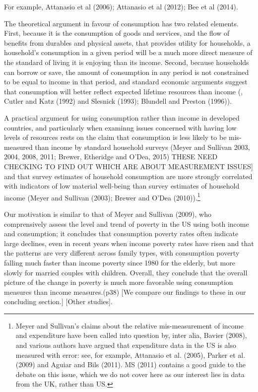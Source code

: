  For example, Attanasio et al (2006); Attanasio et al (2012); Bee et al (2014). 


The theoretical argument in favour of consumption has two related elements. First, because it is the consumption of goods and services, and the flow of benefits from durables and physical assets, that provides utility for households, a household's consumption in a given period will be a much more direct measure of the standard of living it is enjoying than its income. Second, because households can borrow or save, the amount of consumption in any period is not constrained to be equal to income in that period, and standard economic arguments suggest that consumption will better reflect expected lifetime resources than income (\cite{Poterba1989}, Cutler and Katz (1992) and Slesnick (1993); Blundell and Preston (1996)).

A practical argument for using consumption rather than income in developed countries, and particularly when examinng issues concerned with having low levels of resources rests on the claim that consumption is less likely to be mis-measured than income by standard household surveys  (Meyer and Sullivan 2003, 2004, 2008, 2011; Brewer, Etheridge and O'Dea, 2015) THESE NEED CHECKING TO FIND OUT WHICH ARE ABOUT MEASUREMENT ISSUES] and that survey estimates of household consumption are more strongly correlated with indicators of low material well-being than survey estimates of household income (Meyer and Sullivan (2003); Brewer and O'Dea (2010)).\footnote{Meyer and Sullivan's claims about the relative mis-measurement of income and expenditure have been called into question by, inter alia, Bavier (2008), and various authors have argued that expenditure data in the US is also measured with error: see, for example, Attanasio et al. (2005), Parker et al. (2009) and Aguiar and Bils (2011). MS (2011) contains a good guide to the debate on this issue, which we do not cover here as our interest lies in data from the UK, rather than US.}



Our motivation is similar to that of Meyer and Sullivan (2009), who comprensively assess the level and trend of poverty in the US using both income and consumption; it concludes that consumption poverty rates often indicate large declines, even in recent years when income poverty rates have risen and that the patterns are very different across family types, with consumption poverty falling much faster than income poverty since 1980 for the elderly, but more slowly for married couples with children. Overall, they conclude that the overall picture of the change in poverty is much more favorable using consumption measures than income measures.(p38) [We compare our findings to these in our concluding section.]
[Other studies].

